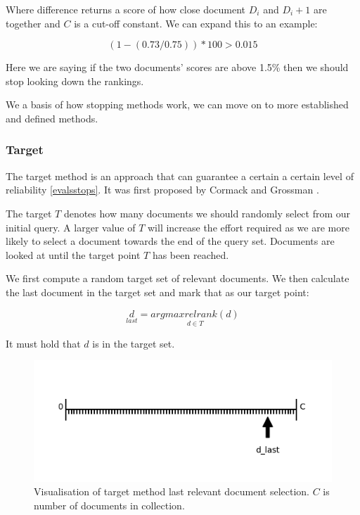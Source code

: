 Where difference returns a score of how close document $D_i$ and $D_i+1$ are together and $C$ is a cut-off constant. We can expand this to an example:

\begin{equation}
	  (1 -(0.73 / 0.75)) * 100 > 0.015
\end{equation}

Here we are saying if the two documents' scores are above 1.5\% then we should stop looking down the rankings.

We a basis of how stopping methods work, we can move on to more established and defined methods.


\subsubsection{Target} \label{target}

The target method is an approach that can guarantee a certain a certain level of reliability \ref{evalsstops}. It was first proposed by Cormack and Grossman \cite{Cormack2016}.

The target $T$ denotes how many documents we should randomly select from our initial query. A larger value of $T$ will increase the effort required as we are more likely to select a document towards the end of the query set. Documents are looked at until the target point $T$ has been reached.

We first compute a random target set of relevant documents. We then calculate the last document in the target set and mark that as our target point:

\begin{equation}
	  \underset{last}{d} = \underset{d \in{T}}{argmax relrank(d)}
\end{equation}

It must hold that $d$ is in the target set.

\begin{figure}[H]
\center
\includegraphics[width=13cm]{figures/target_method.png}
\caption{Visualisation of target method last relevant document selection. $C$ is number of documents in collection.}
\end{figure}

